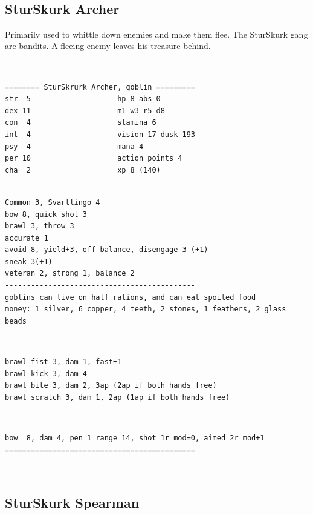 \


\subsection*{SturSkurk Archer}

Primarily used to whittle down enemies and make them flee. The SturSkurk gang are bandits. A fleeing enemy leaves his treasure behind.

\

\goodbreak \small \begin{samepage} \begin{verbatim}
======== SturSkrurk Archer, goblin =========
str  5                    hp 8 abs 0
dex 11                    m1 w3 r5 d8
con  4                    stamina 6
int  4                    vision 17 dusk 193
psy  4                    mana 4
per 10                    action points 4
cha  2                    xp 8 (140)
--------------------------------------------
\end{verbatim} \end{samepage} \goodbreak \begin{samepage} \begin{verbatim}
Common 3, Svartlingo 4
bow 8, quick shot 3
brawl 3, throw 3
accurate 1
avoid 8, yield+3, off balance, disengage 3 (+1)
sneak 3(+1)
veteran 2, strong 1, balance 2
--------------------------------------------
goblins can live on half rations, and can eat spoiled food
money: 1 silver, 6 copper, 4 teeth, 2 stones, 1 feathers, 2 glass beads
\end{verbatim} \begin{samepage}   \   \goodbreak \end{samepage} \begin{verbatim}
brawl fist 3, dam 1, fast+1
brawl kick 3, dam 4 
brawl bite 3, dam 2, 3ap (2ap if both hands free)
brawl scratch 3, dam 1, 2ap (1ap if both hands free)
\end{verbatim} \begin{samepage}   \   \goodbreak \end{samepage} \begin{verbatim}
bow  8, dam 4, pen 1 range 14, shot 1r mod=0, aimed 2r mod+1
============================================
\end{verbatim} \end{samepage} \normalsize

\


\subsection*{SturSkurk Spearman}

